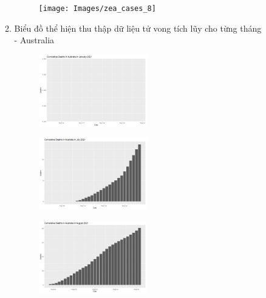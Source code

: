 \documentclass[a4paper]{article}
\theoremstyle{definition}
\begin{document}
\begin{enumerate}[i)]
\begin{enumerate}[1)]
		\begin{figure} [!htp]
  		\centering
  		\texttt{[image: Images/zea\_cases\_8]}
		\end{figure}
    \item Biểu đồ thể hiện thu thập dữ liệu tử vong tích lũy cho từng tháng\\
        - Australia\\
		\begin{figure} [!htp]
  		\centering
  		\includegraphics [width=0.47\textwidth] {Images/aus_deaths_1}
		\end{figure}
		
		\begin{figure} [!htp]
  		\centering
  		\includegraphics [width=0.47\textwidth] {Images/aus_deaths_4}
		\end{figure}
		
		\begin{figure} [!htp]
  		\centering
  		\includegraphics [width=0.47\textwidth] {Images/aus_deaths_6}
		\end{figure}
		

\end{enumerate}
\end{enumerate}
\end{document}
